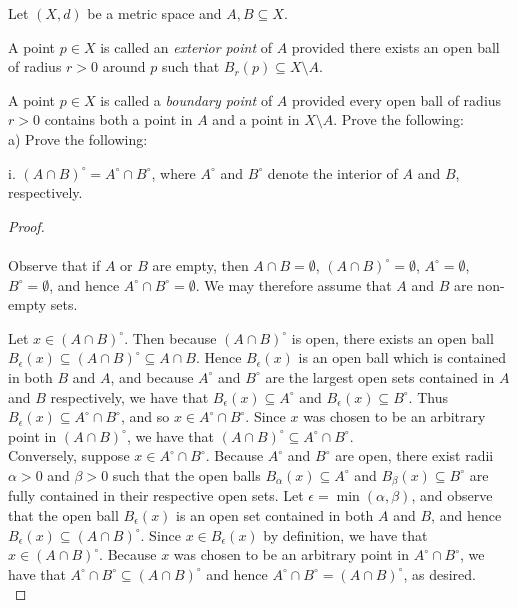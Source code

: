 Let $(X, d)$ be a metric space and $A, B \subseteq X$. 

A point $p \in X$ is called an \emph{exterior point} of $A$ provided there exists an open ball of radius $r > 0$ around
$p$ such that $B_r(p) \subseteq X \setminus A$.

A point $p \in X$ is called a \emph{boundary point} of $A$ provided every open ball of radius $r > 0$ contains both
a point in $A$ and a point in $X \setminus A$. Prove the following: \\

a) Prove the following:

i.  $(A \cap B)^{\circ} = A^{\circ} \cap B^{\circ}$, where $A^{\circ}$ and $B^{\circ}$ denote the interior of $A$ and 
    $B$, respectively. \ \\

\begin{proof}\ \\\\
    Observe that if $A$ or $B$ are empty, then $A \cap B = \emptyset$, $(A \cap B)^\circ = \emptyset$, 
    $A^{\circ} = \emptyset$, $B^{\circ} = \emptyset$, and hence $A^{\circ} \cap B^{\circ} = \emptyset$. We may therefore 
    assume that $A$ and $B$ are non-empty sets.

    Let $x \in (A \cap B)^{\circ}$. Then because $(A \cap B)^{\circ}$ is open, there exists an open ball 
    $B_\epsilon(x) \subseteq (A \cap B)^{\circ} \subseteq A \cap B$. Hence $B_\epsilon(x)$ is an open ball which is 
    contained in both $B$ and $A$, and because $A^\circ$ and $B^\circ$ are the largest open sets contained in $A$ and 
    $B$ respectively, we have that $B_\epsilon(x) \subseteq A^\circ$ and $B_\epsilon(x) \subseteq B^\circ$. Thus 
    $B_\epsilon(x) \subseteq A^\circ \cap B^\circ$, and so $x \in A^\circ \cap B^\circ$. Since $x$ was chosen to be
    an arbitrary point in $(A \cap B)^{\circ}$, we have that $(A \cap B)^{\circ} \subseteq A^\circ \cap B^\circ$. \\

    Conversely, suppose $x \in A^\circ \cap B^\circ$. Because $A^\circ$ and $B^\circ$ are open, there exist radii 
    $\alpha > 0$ and $\beta > 0$ such that the open balls $B_\alpha(x) \subseteq A^\circ$ and 
    $B_\beta(x) \subseteq B^\circ$ are fully contained in their respective open sets. Let 
    $\epsilon = \min{(\alpha, \beta)}$, and observe that the open ball $B_\epsilon(x)$ is an open set contained in both
    $A$ and $B$, and hence $B_\epsilon(x) \subseteq (A \cap B)^\circ$. Since $x \in B_\epsilon(x)$ by definition, we
    have that $x \in (A \cap B)^\circ$. Because $x$ was chosen to be an arbitrary point in $A^\circ \cap B^\circ$, we
    have that $A^\circ \cap B^\circ \subseteq (A \cap B)^\circ$ and hence 
    $A^\circ \cap B^\circ = (A \cap B)^\circ$, as desired.
    \ \\
\end{proof}

